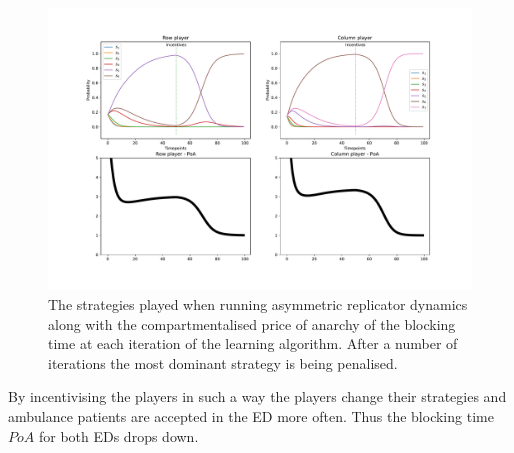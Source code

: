\begin{figure}[H]
    \includegraphics[width=\textwidth, trim=0 400 0 0]{imgs/asymmetric_rd_and_PoA/asymmetric_penalty.pdf}
    \caption{
        The strategies played when running asymmetric replicator dynamics
        along with the compartmentalised price of anarchy of the blocking time 
        at each iteration of the learning algorithm. After a number of 
        iterations the most dominant strategy is being penalised.
    }
    \label{fig:ard_penalty}
\end{figure}

By incentivising the players in such a way the players change their strategies 
and ambulance patients are accepted in the ED more often.
Thus the blocking time \(PoA\) for both EDs drops down. 
